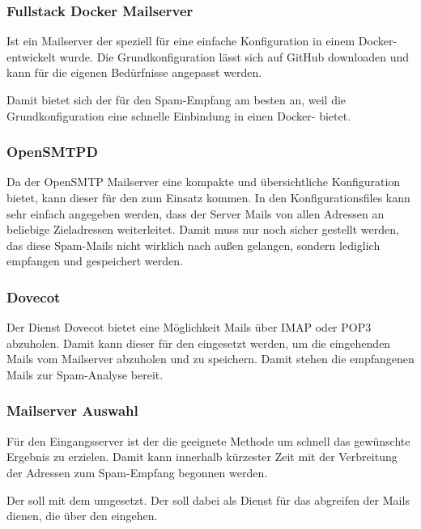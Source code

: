 \documentclass[a4paper,11pt,singlespacing]{article}
\begin{document}
		\subsubsection{Fullstack Docker Mailserver}\label{sec:AuswahlLösungFullstackDockerMailserver}
			Ist ein Mailserver der speziell für eine einfache Konfiguration in einem Docker- entwickelt wurde. Die Grundkonfiguration lässt sich auf GitHub downloaden und kann für die eigenen Bedürfnisse angepasst werden. 
			
			Damit bietet sich der  für den Spam-Empfang am besten an, weil die Grundkonfiguration eine schnelle Einbindung in einen Docker- bietet.
		
		\subsubsection{OpenSMTPD}\label{sec:AuswahlLösungOpenSMTPD}
			Da der OpenSMTP Mailserver eine kompakte und übersichtliche Konfiguration bietet, kann dieser für den  zum Einsatz kommen. In den Konfigurationsfiles kann sehr einfach angegeben werden, dass der Server Mails von allen Adressen an beliebige Zieladressen weiterleitet.
			Damit muss nur noch sicher gestellt werden, das diese Spam-Mails nicht wirklich nach außen gelangen, sondern lediglich empfangen und gespeichert werden.
		
		\subsubsection{Dovecot}\label{sec:AuswahlLösungDovecot}
		Der Dienst Dovecot bietet eine Möglichkeit Mails über IMAP oder POP3 abzuholen. Damit kann dieser für den  eingesetzt werden, um die eingehenden Mails vom Mailserver abzuholen und zu speichern. Damit stehen die empfangenen Mails zur Spam-Analyse bereit.

		\subsubsection{Mailserver Auswahl}\label{sec:MailserverAuswahl}	
		Für den Eingangsserver ist der  die geeignete Methode um schnell das gewünschte Ergebnis zu erzielen. Damit kann innerhalb kürzester Zeit mit der Verbreitung der Adressen zum Spam-Empfang begonnen werden.
		
	Der  soll mit dem  umgesetzt. Der  soll dabei als Dienst für das abgreifen der Mails dienen, die über den  eingehen.
		
\end{document}
